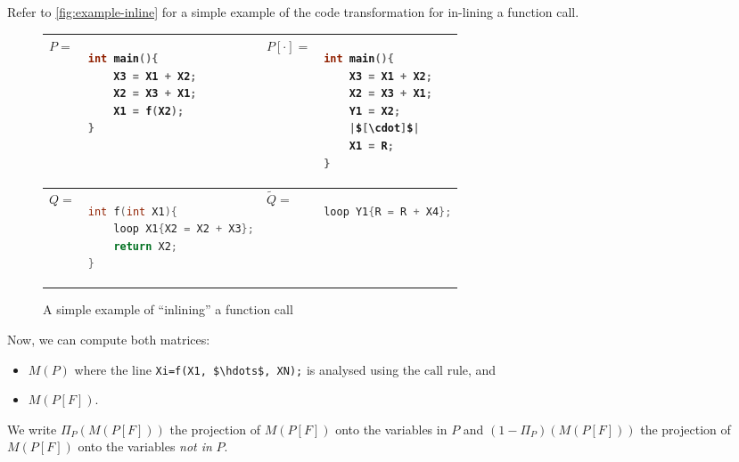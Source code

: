 \documentclass[runningheads]{llncs}
\newcommand{\pr}{\lstinline[mathescape]}
\begin{document}
\begin{example}
	Refer to \autoref{fig:example-inline} for a simple example of the code transformation for in-lining a function call.
	\begin{figure}
		{\centering

			\begin{tabular}{ l l | l l }
				\(P = \)        & \begin{lstlisting}[language=C]
int main(){
	X3 = X1 + X2;
	X2 = X3 + X1;
	X1 = f(X2);
}
\end{lstlisting}
				                &
				\(P[\cdot] = \) & \begin{lstlisting}[language=C]
int main(){
	X3 = X1 + X2;
	X2 = X3 + X1;
	Y1 = X2;
	|$[\cdot]$|
	X1 = R;
}
\end{lstlisting}
				\\ \hline
				\(Q = \)        & \begin{lstlisting}[language=C]
int f(int X1){
	loop X1{X2 = X2 + X3};
	return X2;
}
\end{lstlisting} &
				\(\tilde{Q} =\) & \begin{lstlisting}[language=C]
loop Y1{R = R + X4};
\end{lstlisting}
			\end{tabular}

		}
		\caption{A simple example of \enquote{inlining} a function call}
		\label{fig:example-inline}
	\end{figure}
\end{example}

Now, we can compute both matrices:
\begin{itemize}[nolistsep,noitemsep]
	\item \(M(P)\) where the line \pr|Xi=f(X1, $\hdots$, XN);| is analysed using the \(\mathrm{call}\) rule, and
	\item \(M(P[F])\).
\end{itemize}
We write \(\Pi_P(M(P[F]))\) the projection of \(M(P[F])\) onto the variables in \(P\) and \((1-\Pi_P)(M(P[F]))\) the projection of \(M(P[F])\) onto the variables \emph{not in} \(P\).
\end{document}
